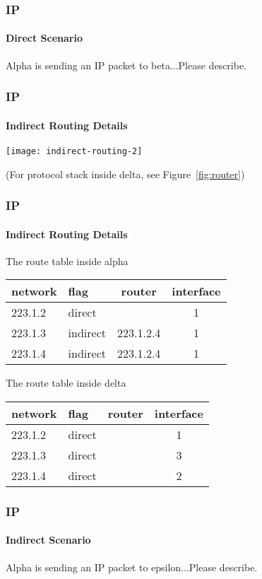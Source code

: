 \documentclass[hyperref={xetex,colorlinks,linkcolor=blue},green,compress]{beamer}
\begin{document}
  \begin{frame}
    \frametitle{IP} \framesubtitle{Direct Scenario}
    Alpha is sending an IP packet to beta...Please describe.
  \end{frame}
  
  \begin{frame}
    \frametitle{IP} \framesubtitle{Indirect Routing Details}\label{indirect-routing}
    \begin{center}
      \texttt{[image: indirect-routing-2]}
    \end{center}
    \tiny{(For protocol stack inside delta, see Figure~\ref{fig:router})}
  \end{frame}

  \begin{frame}
    \frametitle{IP} \framesubtitle{Indirect Routing Details}
    \begin{exampleblock}{The route table inside alpha}
      \begin{center}
        \begin{tabular}{|llcc|}
          \hline
          network & flag & router & interface\\\hline
          223.1.2 & direct & & 1\\
          223.1.3 & indirect & 223.1.2.4 & 1\\
          223.1.4 & indirect & 223.1.2.4 & 1\\\hline
        \end{tabular}
      \end{center}
    \end{exampleblock}

    \begin{exampleblock}{The route table inside delta}
      \begin{center}
        \begin{tabular}{|llcc|}
          \hline
          network & flag & router & interface \\\hline
          223.1.2 & direct & & 1\\
          223.1.3 & direct & & 3\\
          223.1.4 & direct & & 2\\\hline
        \end{tabular}
      \end{center}
    \end{exampleblock}
  \end{frame}

  \begin{frame}
    \frametitle{IP} \framesubtitle{Indirect Scenario}
    Alpha is sending an IP packet to epsilon...Please describe.
  \end{frame}
\end{document}
